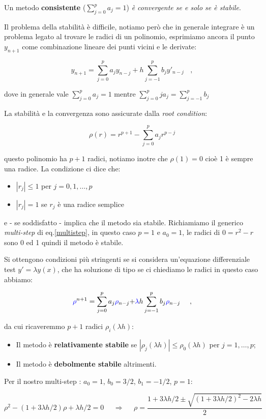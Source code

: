 Un metodo \textbf{consistente} ($\sum_{j=0}^p a_j = 1$) \emph{è convergente se e solo se è stabile}.


Il problema della stabilità è difficile, notiamo però che in generale integrare è un problema legato al trovare le radici di un polinomio, esprimiamo ancora il punto $y_{n+1}$ come combinazione lineare dei punti vicini e le derivate:

\[ y_{n+1} = \sum^p_{j=0} a_j y_{n-j} + h\sum^p_{j=-1} b_j y'_{n-j}\ \ \ \ , \]

dove in generale vale $\sum^p_{j=0} a_j = 1$ mentre $\sum^p_{j=0} ja_j = \sum^p_{j=-1} b_j$

La stabilità e la convergenza sono assicurate dalla \emph{root condition}:

\[ \rho(r) = r^{p+1} - \sum ^ p_{j=0}a_j r^{p-j} \]

questo polinomio ha $p+1$ radici, notiamo inotre che $\rho(1)=0$ cioè 1 è sempre una radice. La condizione ci dice che:
\begin{itemize}
	\item $|r_j|\leq 1$ per $j=0,1,\dots, p$
	\item $|r_j|=1$ se $r_j$ è una radice semplice
\end{itemize}
e - se soddisfatto - implica che il metodo sia stabile.
Richiamiamo il generico \emph{multi-step} di eq.\ref{multistep}, in questo caso $p=1$ e $a_0=1$, le radici di $0=r^2-r$ sono 0 ed 1 quindi il metodo è stabile.

Si ottengono condizioni più stringenti se si considera un'equazione differenziale test $y' = \lambda y(x)$, che ha soluzione di tipo se ci chiediamo le radici in questo caso abbiamo:

\[ \color{blue}{\rho}\color{black}{^{n+1} = \sum^p_{j=0} a_j} \color{blue}{\rho}\color{black}{_{n-j} +} \color{blue}{\lambda} \color{black}h\sum^p_{j=-1} b_j \color{blue}{\rho}\color{black}_{n-j}\ \ \ \ ,\]

da cui ricaveremmo $p+1$ radici $\rho_i(\lambda h)$:
\begin{itemize}
	\item Il metodo è \textbf{relativamente stabile} se $|\rho_j(\lambda h) |\leq \rho_0(\lambda h)$ per $j=1,\dots, p$;
	\item Il metodo è \textbf{debolmente stabile} altrimenti.
\end{itemize}

Per il nostro multi-step : $a_0=1$, $b_0=3/2$, $b_1=-1/2$, $p=1$:

\[ \rho^2 - (1+3\lambda h/2)\rho + \lambda h/2 = 0\ \ \ \ \ \  \Rightarrow \ \ \ \ \ \ \rho = \frac{1+3\lambda h/2 \pm \sqrt{(1+3\lambda h/2)^2-2\lambda h}}{2}\]

